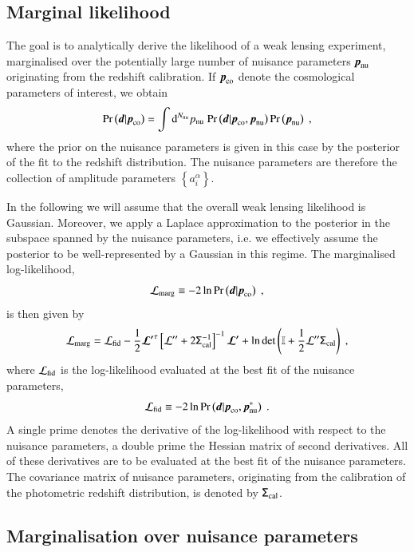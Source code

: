 \documentclass{aa}
\newcommand{\eq}[1]{\begin{equation}  #1 \end{equation}}
\newcommand{\br}[1]{\left( #1 \right)}
\newcommand{\bc}[1]{\left\{ #1 \right\}}
\newcommand{\bb}[1]{\left[ #1 \right]}
\newcommand{\dd}{{\rm d}}
\newcommand{\pr}{{\rm Pr}}
\begin{document}
\subsection{Marginal likelihood}

The goal is to analytically derive the likelihood of a weak lensing experiment, marginalised over the potentially large number of nuisance parameters $\boldsymbol{p}_{\rm nu}$ originating from the redshift calibration. If $\boldsymbol{p}_{\rm co}$ denote the cosmological parameters of interest, we obtain
\eq{
\pr \br{\boldsymbol{d} | \boldsymbol{p}_{\rm co}} = \int \dd^{N_{\rm nu}} p_{\rm nu}\; \pr \br{\boldsymbol{d} | \boldsymbol{p}_{\rm co}, \boldsymbol{p}_{\rm nu}} \pr \br{\boldsymbol{p}_{\rm nu}}\;,
}
where the prior on the nuisance parameters is given in this case by the posterior of the fit to the redshift distribution. The nuisance parameters are therefore the collection of amplitude parameters $\bc{a_i^\alpha}$.

In the following we will assume that the overall weak lensing likelihood is Gaussian. Moreover, we apply a Laplace approximation to the posterior in the subspace spanned by the nuisance parameters, i.e. we effectively assume the posterior to be well-represented by a Gaussian in this regime. The marginalised log-likelihood,
\eq{
{\cal L}_{\rm marg}  \equiv -2 \ln \pr \br{\boldsymbol{d} | \boldsymbol{p}_{\rm co}}\;,
}
is then given by \citep{taylor10}
\eq{
\label{eq:marginal_likelihood}
{\cal L}_{\rm marg} = {\cal L}_{\rm fid} - \frac{1}{2} \boldsymbol{\cal L^\prime}^\tau  \bb{ {\cal L^{\prime\prime}} + 2 \tens{\Sigma}^{-1}_{\rm cal} }^{-1} \boldsymbol{\cal L^\prime} + \ln \det \br{ \mathbb{I} + \frac{1}{2} {\cal L^{\prime\prime}} \tens{\Sigma}_{\rm cal}}\;,
}
where ${\cal L}_{\rm fid}$ is the log-likelihood evaluated at the best fit of the nuisance parameters,
\eq{
{\cal L}_{\rm fid} \equiv -2 \ln \pr \br{\boldsymbol{d} | \boldsymbol{p}_{\rm co}, \boldsymbol{p}^*_{\rm nu}}\;.
}
A single prime denotes the derivative of the log-likelihood with respect to the nuisance parameters, a double prime the Hessian matrix of second derivatives. All of these derivatives are to be evaluated at the best fit of the nuisance parameters. The covariance matrix of nuisance parameters, originating from the calibration of the photometric redshift distribution, is denoted by $\mathsf{\Sigma}_{\rm cal} $.

\subsection{Marginalisation over nuisance parameters}
\end{document}
